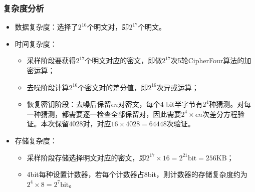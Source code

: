 \subsubsection{复杂度分析}
\begin{itemize}
    \item 数据复杂度：选择了$2^{16}$个明文对，即$2^{17}$个明文。
    \item 时间复杂度：
    \begin{itemize}
        \item 采样阶段要获得$2^{17}$个明文对应的密文，即做$2^{17}$次5轮CipherFour算法的加密运算；
        \item 去噪阶段计算$2^{16}$个密文对的差分值，即$2^{16}$次异或运算；
        \item 恢复密钥阶段：去噪后保留$\epsilon n$对密文，每个4 bit半字节有$2^4$种猜测。对每一种猜测，都需要逐一检查全部保留对，因此需要$2^4\times\epsilon n$次差分方程验证。本次保留$4028$对，对应$16\times4028=64448$次验证。
    \end{itemize}
    \item 存储复杂度：
    \begin{itemize}
        \item 采样阶段存储选择明文对应的密文，即$2^{17} \times 16 = 2^21\text{bit} = 256\text{KB}$；
        \item 4bit每种设置计数器，若每个计数器占8bit，则计数器的存储复杂度约为$2^4 \times 8 = 2^7\text{bit}$。
    \end{itemize}
\end{itemize}
